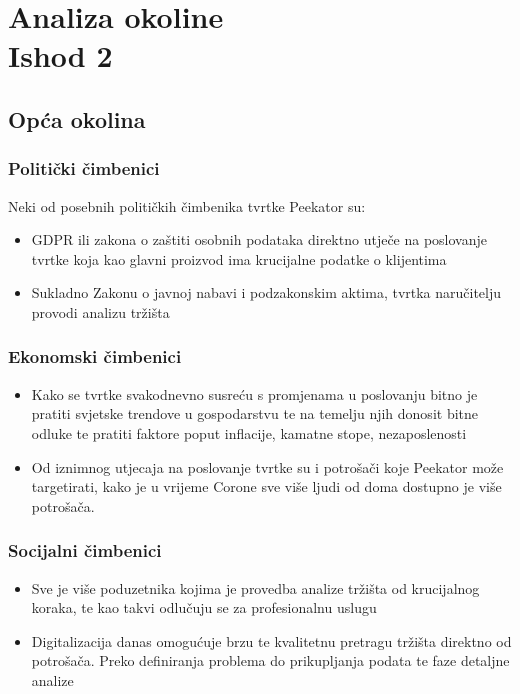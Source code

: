 \documentclass[a4paper]{article}
\begin{document}
\newpage

	\section[Section Title. Section Subtitle]{Analiza okoline\\ {\small Ishod 2}}
	
	\subsection{Opća okolina}
	\subsubsection{Politički čimbenici}
	
	Neki od posebnih političkih čimbenika tvrtke Peekator su:
	\begin{itemize}
		\item GDPR ili zakona o zaštiti osobnih podataka direktno utječe na poslovanje tvrtke koja kao glavni proizvod ima krucijalne podatke o klijentima
	 \item Sukladno Zakonu o javnoj nabavi i podzakonskim aktima, tvrtka naručitelju provodi analizu tržišta
	\end{itemize}
	
	\subsubsection{Ekonomski čimbenici}
	
	\begin{itemize}
		\item Kako se tvrtke svakodnevno susreću s promjenama u poslovanju bitno je pratiti svjetske trendove u gospodarstvu te na temelju njih donosit bitne odluke te pratiti faktore poput inflacije, kamatne stope, nezaposlenosti
		\item Od iznimnog utjecaja na poslovanje tvrtke su i potrošači koje Peekator može targetirati, kako je u vrijeme Corone sve više ljudi od doma dostupno je više potrošača. 
	\end{itemize}
	
	\subsubsection{Socijalni čimbenici }
	
	\begin{itemize}
		\item Sve je više poduzetnika kojima je provedba analize tržišta od krucijalnog koraka, te kao takvi odlučuju se za profesionalnu uslugu
		\item Digitalizacija danas omogućuje brzu te kvalitetnu pretragu tržišta direktno od potrošača. Preko definiranja problema do prikupljanja podata te faze detaljne analize
	\end{itemize}
		
\end{document}
